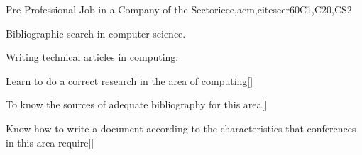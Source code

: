 \begin{syllabus}
\begin{unit}{}{Pre Professional Job in a Company of the Sector}{ieee,acm,citeseer}{60}{C1,C20,CS2}
  \begin{topics}
      \item Bibliographic search in computer science.
      \item Writing technical articles in computing.
  \end{topics}
  \begin{learningoutcomes}
      \item Learn to do a correct research in the area of computing[\Usage]
      \item To know the sources of adequate bibliography for this area[\Usage]
      \item Know how to write a document according to the characteristics that conferences in this area require[\Usage]
  \end{learningoutcomes}
\end{unit}

\begin{coursebibliography}
\end{coursebibliography}

\end{syllabus}
